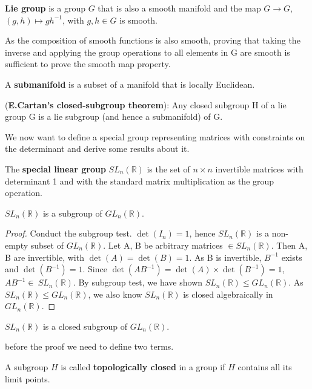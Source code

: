 \documentclass[12pt,twoside]{article}
\begin{document}
\begin{definition}
\textbf{Lie group}\cite{rie geo} is a group $G$ that is also a smooth manifold and the map $G \rightarrow G$, $(g,h)\mapsto gh^{-1}$, with $g,h\in G$ is smooth.
\end{definition}
As the composition of smooth functions is also smooth, proving that taking the inverse and applying the group operations to all elements in G are smooth is sufficient to prove the smooth map property.

\begin{definition}
A \textbf{submanifold} is a subset of a manifold that is locally Euclidean.
\end{definition}

\begin{theorem}{(\textbf{E.Cartan's closed-subgroup theorem}):} \cite{cartan subgroup}
\label{Ecartan}
Any closed subgroup H of a lie group G is a lie subgroup (and hence a submanifold) of G.
\end{theorem}
We now want to define a special group representing matrices with constraints on the determinant and derive some results about it.
\begin{definition}
The \textbf{special linear group} $SL_{n}(\mathbb{R})$ is the set of $n\times n$ invertible matrices with determinant 1 and with the standard matrix multiplication as the group operation.
\end{definition}
\begin{proposition}
$SL_{n}(\mathbb{R})$ is a subgroup of $GL_{n}(\mathbb{R})$.
\begin{proof}
Conduct the subgroup test. $\det(I_{n})=1$, hence $SL_{n}(\mathbb{R})$ is a non-empty subset of $GL_{n}(\mathbb{R})$.
Let A, B be arbitrary matrices $\in SL_{n}(\mathbb{R})$. Then A, B are invertible, with $\det(A) =\det(B)=1$. As B is invertible, $B^{-1}$ exists and $\det(B^{-1})=1$. Since $\det(AB^{-1})= \det(A)\times \det(B^{-1})=1$, $AB^{-1}\in\ SL_{n}(\mathbb{R})$. By subgroup test, we have shown $SL_{n}(\mathbb{R}) \leqslant GL_{n}(\mathbb{R}) $. As $SL_{n}(\mathbb{R}) \leqslant GL_{n}(\mathbb{R})$, we also know $SL_{n}(\mathbb{R})$ is closed algebraically in $GL_{n}(\mathbb{R})$.
\end{proof}
\end{proposition}

\begin{proposition}
\label{SLnclosed}
$SL_{n}(\mathbb{R})$ is a closed subgroup of $GL_{n}(\mathbb{R})$.
\end{proposition}
before the proof we need to define two terms.
\begin{definition}
A subgroup $H$ is called \textbf{topologically closed} in a group if $H$ contains all its limit points.
\end{definition}
\end{document}
